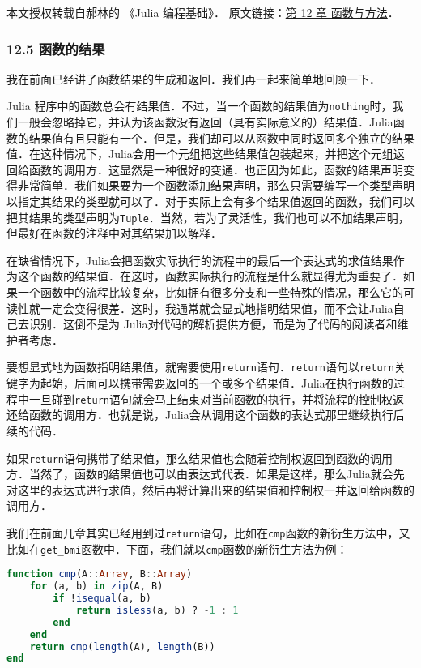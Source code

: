 
本文授权转载自郝林的 《Julia 编程基础》． 原文链接：\href{https://github.com/hyper0x/JuliaBasics/blob/master/book/ch12.md}{第 12 章 函数与方法}．


\subsubsection{12.5 函数的结果}

我在前面已经讲了函数结果的生成和返回．我们再一起来简单地回顾一下．

Julia 程序中的函数总会有结果值．不过，当一个函数的结果值为\verb|nothing|时，我们一般会忽略掉它，并认为该函数没有返回（具有实际意义的）结果值．Julia函数的结果值有且只能有一个．但是，我们却可以从函数中同时返回多个独立的结果值．在这种情况下，Julia会用一个元组把这些结果值包装起来，并把这个元组返回给函数的调用方．这显然是一种很好的变通．也正因为如此，函数的结果声明变得非常简单．我们如果要为一个函数添加结果声明，那么只需要编写一个类型声明以指定其结果的类型就可以了．对于实际上会有多个结果值返回的函数，我们可以把其结果的类型声明为\verb|Tuple|．当然，若为了灵活性，我们也可以不加结果声明，但最好在函数的注释中对其结果加以解释．

在缺省情况下，Julia会把函数实际执行的流程中的最后一个表达式的求值结果作为这个函数的结果值．在这时，函数实际执行的流程是什么就显得尤为重要了．如果一个函数中的流程比较复杂，比如拥有很多分支和一些特殊的情况，那么它的可读性就一定会变得很差．这时，我通常就会显式地指明结果值，而不会让Julia自己去识别．这倒不是为 Julia对代码的解析提供方便，而是为了代码的阅读者和维护者考虑．

要想显式地为函数指明结果值，就需要使用\verb|return|语句．\verb|return|语句以\verb|return|关键字为起始，后面可以携带需要返回的一个或多个结果值．Julia在执行函数的过程中一旦碰到\verb|return|语句就会马上结束对当前函数的执行，并将流程的控制权返还给函数的调用方．也就是说，Julia会从调用这个函数的表达式那里继续执行后续的代码．

如果\verb|return|语句携带了结果值，那么结果值也会随着控制权返回到函数的调用方．当然了，函数的结果值也可以由表达式代表．如果是这样，那么Julia就会先对这里的表达式进行求值，然后再将计算出来的结果值和控制权一并返回给函数的调用方．

我们在前面几章其实已经用到过\verb|return|语句，比如在\verb|cmp|函数的新衍生方法中，又比如在\verb|get_bmi|函数中．下面，我们就以\verb|cmp|函数的新衍生方法为例：

\begin{lstlisting}[language=julia]
function cmp(A::Array, B::Array)
    for (a, b) in zip(A, B)
        if !isequal(a, b)
            return isless(a, b) ? -1 : 1
        end
    end
    return cmp(length(A), length(B))
end
\end{lstlisting}

